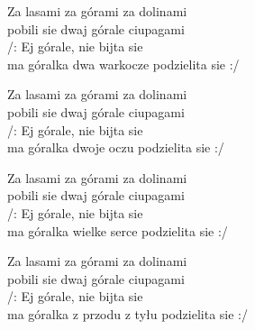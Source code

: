 
\ve{}
Za lasami za górami za dolinami\\
pobili sie dwaj górale ciupagami\\
/: Ej górale, nie bijta sie\\
ma góralka dwa warkocze podzielita sie :/

\ve{}
Za lasami za górami za dolinami\\
pobili sie dwaj górale ciupagami\\
/: Ej górale, nie bijta sie\\
ma góralka dwoje oczu podzielita sie :/

\ve{}
Za lasami za górami za dolinami\\
pobili sie dwaj górale ciupagami\\
/: Ej górale, nie bijta sie\\
ma góralka wielke serce podzielita sie :/

\ve{}
Za lasami za górami za dolinami\\
pobili sie dwaj górale ciupagami\\
/: Ej górale, nie bijta sie\\
ma góralka z przodu z tyłu podzielita sie :/

\esong{}